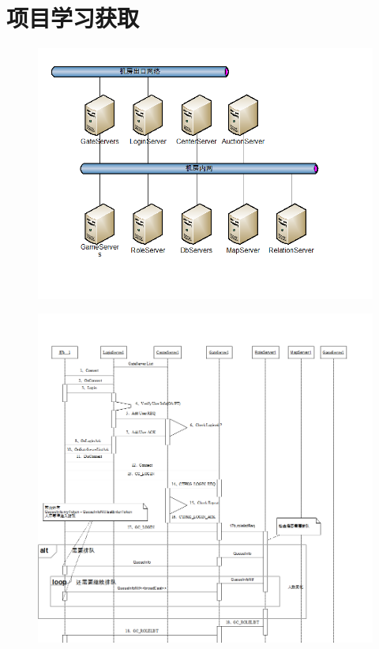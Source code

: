 \documentclass[UTF8,a4paper,8pt]{ctexart}
\begin{document}
\section{项目学习获取}
		\begin{figure}[h] 	
			\centering
			\includegraphics[width=14cm,clip]{gameServer15.png} 	
			\label{fig:gameServer15}
		\end{figure} 	
		
		
		\begin{figure}[h] 	
			\centering
			\includegraphics[width=14cm,clip]{gameServer16.png} 	
			\label{fig:gameServer16}
		\end{figure} 					
\end{document}
